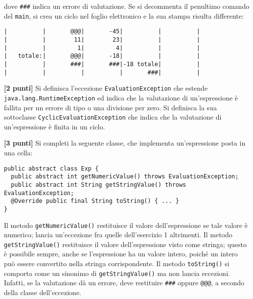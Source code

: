 \documentclass{article}[10pt]
\newcounter{esnu}
\newenvironment{esercizio}{\medskip \noindent {\bf Esercizio\addtocounter{esnu}{1} \arabic{esnu}}}{}
\begin{document}
\noindent
dove \texttt{\#\#\#} indica un errore di valutazione.
Se si decommenta il penultimo comando del \texttt{main}, si crea un ciclo nel foglio elettronico
e la sua stampa risulta differente:

{\scriptsize
\begin{verbatim}
|          |       @@@|       -45|          |          |
|          |        11|        23|          |          |
|          |         1|         4|          |          |
|   totale:|       @@@|       -18|          |          |
|          |       ###|       ###|-18 totale|          |
|          |          |          |       ###|          |
\end{verbatim}
}

\begin{esercizio}
\textbf{[2 punti]}
Si definisca l'eccezione \texttt{EvaluationException} che estende \texttt{java.lang.RuntimeException}
ed indica che la valutazione di un'espressione \`e fallita per un errore di tipo o una divisione per zero.
Si definisca la sua sottoclasse \texttt{CyclicEvaluationException} che indica che la valutazione di un'espressione
\`e finita in un ciclo.
\end{esercizio}

\begin{esercizio}
\textbf{[3 punti]}
Si completi la seguente classe, che implementa un'espressione posta in una cella:

{\small
\begin{verbatim}
public abstract class Exp {
  public abstract int getNumericValue() throws EvaluationException;
  public abstract int String getStringValue() throws EvaluationException;
  @Override public final String toString() { ... }
}
\end{verbatim}
}

\noindent
Il metodo \texttt{getNumericValue()} restituisce il valore dell'espressione se tale valore 
\`e numerico; lancia un'eccezione fra quelle dell'esercizio 1 altrimenti. Il metodo
\texttt{getStringValue()} restituisce il valore dell'espressione visto come stringa; questo \`e
possibile sempre, anche se l'espressione ha un valore intero, poich\'e un intero pu\`o essere convertito
nella stringa corrispondente. Il metodo \texttt{toString()} si comporta come un sinonimo di
\texttt{getStringValue()} ma non lancia eccezioni. Infatti, se la valutazione d\`a un errore, deve restituire
\texttt{\#\#\#} oppure \texttt{@@@}, a secondo della classe dell'eccezione.
\end{esercizio}
\end{document}
